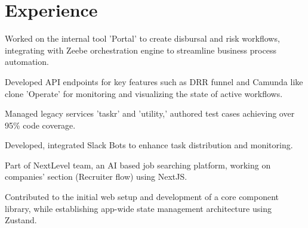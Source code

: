 \documentclass[]{plushcv}
\begin{document}
%
%




%
%

\begin{minipage}[t]{0.70\textwidth} 



\section{Experience}
\vspace{\topsep} %
\begin{tightemize}
\sectiontopsep
\item Worked on the internal tool 'Portal' to create disbursal and risk workflows, integrating with Zeebe orchestration engine to streamline business process automation.
\item Developed API endpoints for key features such as DRR funnel and Camunda like clone \mbox{'Operate'} for monitoring and visualizing the state of active workflows. 
\item Managed legacy services 'taskr' and 'utility,' authored test cases achieving over 95\% code coverage.
\item Developed, integrated Slack Bots to enhance task distribution and monitoring.
\end{tightemize}
\sectionbottomsep


\vspace{\topsep} %
\begin{tightemize}
\item Part of NextLevel team, an AI based job searching platform, working on companies’ \mbox{section} (Recruiter flow) using NextJS.
\item Contributed to the initial web setup and development of a core component library, while establishing app-wide state management architecture using Zustand.
\end{tightemize}
\sectionbottomsep



\end{minipage}
\end{document}
